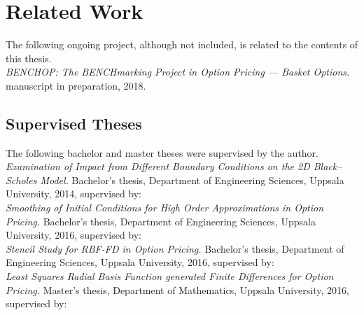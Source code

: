 \documentclass{UUThesisTemplate}
\begin{document}
    




%
\chapter*{Related Work}
    \noindent The following ongoing project, although not included, is related to the contents of this thesis.\\
    
	\noindent {} 
    	\emph{BENCHOP: The BENCHmarking Project in Option Pricing --- Basket Options.}  	  
    	manuscript in preparation, 2018. \label{paper7}	

\section*{Supervised Theses}
The following bachelor and master theses were supervised by the author.\\
	
	\noindent {} 
    	\emph{Examination of Impact from Different Boundary Conditions on the 2D Black--Scholes Model.}  	  
    	Bachelor's thesis, Department of Engineering Sciences, Uppsala University, 2014,
	supervised by: \\
	
	\noindent {} 
    	\emph{Smoothing of Initial Conditions for High Order Approximations in Option Pricing.}  	  
    	Bachelor's thesis, Department of Engineering Sciences, Uppsala University, 2016,
	supervised by: \\
	
	\noindent {} 
    	\emph{Stencil Study for RBF-FD in Option Pricing.}  	  
    	Bachelor's thesis, Department of Engineering Sciences, Uppsala University, 2016,
	supervised by: \\

	\noindent {} 
    	\emph{Least Squares Radial Basis Function generated Finite Differences for Option Pricing.}  	  
    	Master's thesis, Department of Mathematics, Uppsala University, 2016,
	supervised by: \\	
\end{document}

